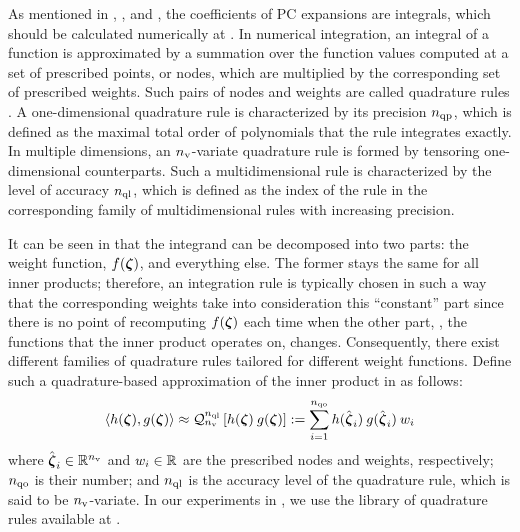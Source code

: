 As mentioned in , , and , the coefficients of PC expansions are integrals, which should be calculated numerically at .
In numerical integration, an integral of a function is approximated by a summation over the function values computed at a set of prescribed points, or nodes, which are multiplied by the corresponding set of prescribed weights.
Such pairs of nodes and weights are called quadrature rules \cite{press2007}.
A one-dimensional quadrature rule is characterized by its precision ${n_\text{qp}}$, which is defined as the maximal total order \cite{heiss2008} of polynomials that the rule integrates exactly.
In multiple dimensions, an ${n_\text{v}}$-variate quadrature rule is formed by tensoring one-dimensional counterparts. Such a multidimensional rule is characterized by the level of accuracy ${n_\text{ql}}$, which is defined as the index of the rule in the corresponding family of multidimensional rules with increasing precision.

It can be seen in  that the integrand can be decomposed into two parts: the weight function, $f(\boldsymbol{\zeta})$, and everything else.
The former stays the same for all inner products; therefore, an integration rule is typically chosen in such a way that the corresponding weights take into consideration this ``constant'' part since there is no point of recomputing $f(\boldsymbol{\zeta})$ each time when the other part, \ie, the functions that the inner product operates on, changes.
Consequently, there exist different families of quadrature rules tailored for different weight functions.
Define such a quadrature-based approximation of the inner product in  as follows:
\[
  \oInner{h(\vz)}{g(\vz)} \approx \oQuad{\nvars}{\qdlevel}{h(\vz) \: g(\vz)} := \sum_{i = 1}^{\qdorder} h(\qdn{\vz}_i) \: g(\qdn{\vz}_i) \: \qdw_i
\]
where $\hat{\boldsymbol{\zeta}}_i \in \mathbb{R}^{n_\text{v}}$ and $w_i \in \mathbb{R}$ are the prescribed nodes and weights, respectively; ${n_\text{qo}}$ is their number; and ${n_\text{ql}}$ is the accuracy level of the quadrature rule, which is said to be ${n_\text{v}}$-variate.
In our experiments in , we use the library of quadrature rules available at \cite{burkardt2013}.

